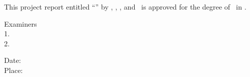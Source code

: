 \noindent This project report entitled ``\ProjectTitle'' by
\StudentOne, \StudentTwo, \StudentThree, and \StudentFour\ is approved
for the degree of \DegreeName\ in \ProgramName.
\vspace{25mm}
\begin{flushright}
\begin{minipage}{.65\textwidth}
Examiners\\[12mm]
1.\ \Blank[75mm]\\[18mm]
2.\ \Blank[75mm]
\end{minipage}
\end{flushright}
\vfill\noindent Date: \Blank[45mm]\\[7mm]
Place: \Blank[45mm]
\clearpage
